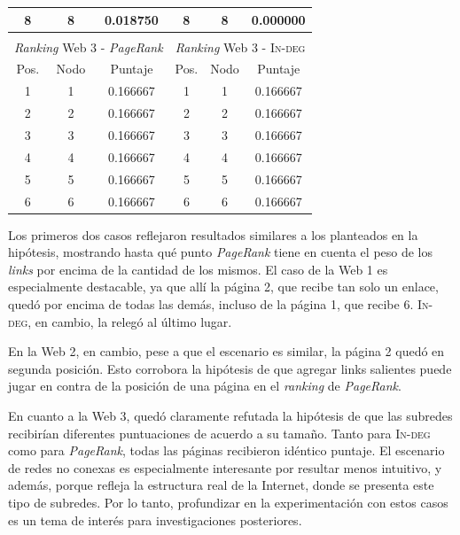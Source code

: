 \begin{center}
\begin{tabular}{|c|c|c||c|c|c|}
                    8    & 8    & 0.018750   & 8    & 8    & 0.000000 \\ \hline
                    \multicolumn{6}{c}{} \\ \hline
                    \multicolumn{3}{|c||}{\emph{Ranking} Web 3 - \emph{PageRank}} & \multicolumn{3}{c|}{\emph{Ranking} Web 3 - \textsc{In-deg}} \\ \hline
                    Pos. & Nodo & Puntaje    & Pos. & Nodo & Puntaje  \\ \hline
                    1    & 1    & 0.166667   & 1    & 1    & 0.166667 \\
                    2    & 2    & 0.166667   & 2    & 2    & 0.166667 \\
                    3    & 3    & 0.166667   & 3    & 3    & 0.166667 \\
                    4    & 4    & 0.166667   & 4    & 4    & 0.166667 \\
                    5    & 5    & 0.166667   & 5    & 5    & 0.166667 \\
                    6    & 6    & 0.166667   & 6    & 6    & 0.166667 \\ \hline
                \end{tabular}
            \end{center}

            Los primeros dos casos reflejaron resultados similares a los planteados en la hipótesis, mostrando hasta qué punto \emph{PageRank} tiene en cuenta el peso de los \emph{links} por encima de la cantidad de los mismos. El caso de la Web 1 es especialmente destacable, ya que allí la página 2, que recibe tan solo un enlace, quedó por encima de todas las demás, incluso de la página 1, que recibe 6. \textsc{In-deg}, en cambio, la relegó al último lugar.

            En la Web 2, en cambio, pese a que el escenario es similar, la página 2 quedó en segunda posición. Esto corrobora la hipótesis de que agregar links salientes puede jugar en contra de la posición de una página en el \emph{ranking} de \emph{PageRank}.

            En cuanto a la Web 3, quedó claramente refutada la hipótesis de que las subredes recibirían diferentes puntuaciones de acuerdo a su tamaño. Tanto para \textsc{In-deg} como para \emph{PageRank}, todas las páginas recibieron idéntico puntaje. El escenario de redes no conexas es especialmente interesante por resultar menos intuitivo, y además, porque refleja la estructura real de la Internet, donde se presenta este tipo de subredes. Por lo tanto, profundizar en la experimentación con estos casos es un tema de interés para investigaciones posteriores.

